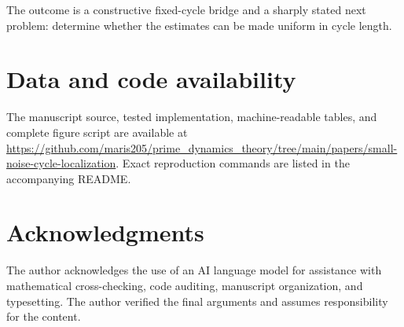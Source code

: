 \documentclass[11pt]{article}
\theoremstyle{remark}
\begin{document}
The outcome is a constructive fixed-cycle bridge and a sharply stated next
problem: determine whether the estimates can be made uniform in cycle length.

\section*{Data and code availability}

The manuscript source, tested implementation, machine-readable tables, and
complete figure script are available at
\url{https://github.com/maris205/prime_dynamics_theory/tree/main/papers/small-noise-cycle-localization}.
Exact reproduction commands are listed in the accompanying README.

\section*{Acknowledgments}

The author acknowledges the use of an AI language model for assistance with
mathematical cross-checking, code auditing, manuscript organization, and
typesetting.  The author verified the final arguments and assumes
responsibility for the content.

{\small


}
\end{document}
